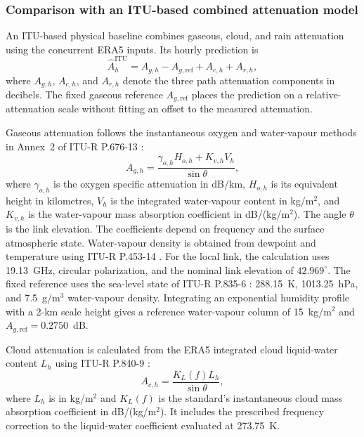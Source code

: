 
\subsubsection{Comparison with an ITU-based combined attenuation model}
\label{subsubsec:itu_combined_reference}

An ITU-based physical baseline combines gaseous, cloud, and rain
attenuation using the concurrent ERA5 inputs. Its hourly prediction is
\begin{equation}
\widehat{A}_{h}^{\mathrm{ITU}}
= A_{g,h}-A_{g,\mathrm{ref}}+A_{c,h}+A_{r,h},
\label{eq:itu_hourly_combination}
\end{equation}
where $A_{g,h}$, $A_{c,h}$, and $A_{r,h}$ denote the three path
attenuation components in decibels. The fixed gaseous reference
$A_{g,\mathrm{ref}}$ places the prediction on a relative-attenuation
scale without fitting an offset to the measured attenuation.

Gaseous attenuation follows the instantaneous oxygen and water-vapour
methods in Annex~2 of ITU-R P.676-13 \cite{ITU676_13}:
\begin{equation}
A_{g,h}
= \frac{\gamma_{o,h}H_{o,h}+K_{v,h}V_h}{\sin\theta},
\label{eq:itu_gaseous_hourly}
\end{equation}
where $\gamma_{o,h}$ is the oxygen specific attenuation in dB/km,
$H_{o,h}$ is its equivalent height in kilometres, $V_h$ is the
integrated water-vapour content in kg/m$^2$, and $K_{v,h}$ is the
water-vapour mass absorption coefficient in dB/(kg/m$^2$).
The angle $\theta$ is the link elevation.
The coefficients depend on frequency and the surface atmospheric
state. Water-vapour density is obtained from dewpoint and temperature
using ITU-R P.453-14 \cite{ITU453_14}.
For the local link, the calculation uses 19.13~GHz, circular
polarization, and the nominal link elevation of $42.969^{\circ}$.
The fixed reference uses the sea-level state of ITU-R P.835-6
\cite{ITU835_6}: 288.15~K, 1013.25~hPa, and 7.5~g/m$^3$ water-vapour
density. Integrating an exponential humidity profile with a 2-km
scale height gives a reference water-vapour column of 15~kg/m$^2$
and $A_{g,\mathrm{ref}}=0.2750$~dB.

Cloud attenuation is calculated from the ERA5 integrated cloud
liquid-water content $L_h$ using ITU-R P.840-9 \cite{ITU840_9}:
\begin{equation}
A_{c,h}=\frac{K_L(f)L_h}{\sin\theta},
\label{eq:itu_cloud_hourly}
\end{equation}
where $L_h$ is in kg/m$^2$ and $K_L(f)$ is the standard's
instantaneous cloud mass absorption coefficient in dB/(kg/m$^2$).
It includes the prescribed frequency correction to the liquid-water
coefficient evaluated at 273.75~K.

